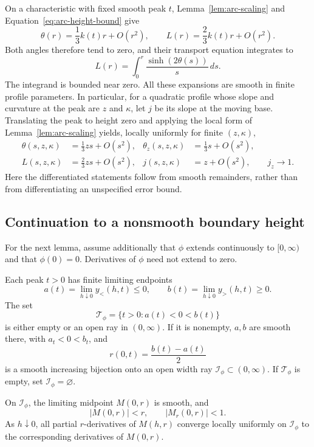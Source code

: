 On a characteristic with fixed smooth peak \(t\),
Lemma~\ref{lem:arc-scaling} and Equation~\eqref{eq:arc-height-bound}
give
\[
  \theta(r)=\frac13 k(t)r+O(r^2),\qquad
  L(r)=\frac23 k(t)r+O(r^2).
\]
Both angles therefore tend to zero, and their transport equation
integrates to
\begin{equation}\label{eq:arc-L-integral}
  L(r)=\int_0^r\frac{\sinh(2\theta(s))}{s}\,ds.
\end{equation}
The integrand is bounded near zero. All these expansions are smooth
in finite profile parameters. In particular, for a quadratic profile
whose slope and curvature at the peak are \(z\) and \(\kappa\), let
\(j\) be its slope at the moving base. Translating the peak to height
zero and applying the local form of Lemma~\ref{lem:arc-scaling} yields,
locally uniformly for finite \((z,\kappa)\),
\begin{equation}\label{eq:arc-peak-expansions}
\begin{aligned}
  \theta(s,z,\kappa)&=\frac13 zs+O(s^2),&
  \theta_z(s,z,\kappa)&=\frac13 s+O(s^2),\\
  L(s,z,\kappa)&=\frac23 zs+O(s^2),&
  j(s,z,\kappa)&=z+O(s^2),\qquad j_z\longrightarrow1 .
\end{aligned}
\end{equation}
Here the differentiated statements follow from smooth remainders,
rather than from differentiating an unspecified error bound.

\subsection{Continuation to a nonsmooth boundary height}

For the next lemma, assume additionally that \(\phi\) extends
continuously to \([0,\infty)\) and that \(\phi(0)=0\).
Derivatives of \(\phi\) need not extend to zero.

\begin{lemma}\label{lem:axis-extension}
Each peak \(t>0\) has finite limiting endpoints
\[
  a(t)=\lim_{h\downarrow0}y_<(h,t)\le0,\qquad
  b(t)=\lim_{h\downarrow0}y_>(h,t)\ge0.
\]
The set
\[
  \mathcal T_\phi=\{t>0:a(t)<0<b(t)\}
\]
is either empty or an open ray in \((0,\infty)\). If it is nonempty,
\(a,b\) are smooth there, with \(a_t<0<b_t\), and
\[
  r(0,t)=\frac{b(t)-a(t)}2
\]
is a smooth increasing bijection onto an open width ray
\(\mathcal I_\phi\subset(0,\infty)\). If \(\mathcal T_\phi\) is empty,
set \(\mathcal I_\phi=\varnothing\).

On \(\mathcal I_\phi\), the limiting midpoint \(M(0,r)\) is smooth,
and
\[
  |M(0,r)|<r,\qquad |M_r(0,r)|<1.
\]
As \(h\downarrow0\), all partial \(r\)-derivatives of \(M(h,r)\)
converge locally uniformly on \(\mathcal I_\phi\) to the corresponding
derivatives of \(M(0,r)\).
\end{lemma}

